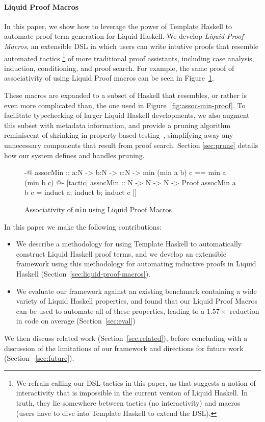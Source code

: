 \paragraph*{Liquid Proof Macros}

In this paper, we show how to leverage the power of Template Haskell
to automate proof term generation for Liquid Haskell.  We develop {\em
  Liquid Proof Macros}, an extensible DSL in which users can write
intutive proofs that resemble automated tactics%
\footnote{We refrain calling our DSL tactics in this paper, as that suggests a
  notion of interactivity that is impossible in the current version of Liquid
  Haskell. In truth, they lie somewhere between tactics (no interactivity)
  and macros (users have to dive into Template Haskell to extend the DSL).
}%
%
 of more traditional proof assistants, including case analysis,
 induction, conditioning, and proof search. For example, the same
 proof of associativity of  using Liquid Proof macros can be
 seen in Figure~\ref{fig:assoc-min-macro}. 

These macros are expanded to a subset of Haskell that resembles, or
rather is even more complicated than, the one used in
Figure~\ref{fig:assoc-min-proof}. To facilitate typechecking of larger
Liquid Haskell developments, we also augment this subset with metadata
information, and provide a pruning algorithm reminiscent of shrinking
in property-based testing~\cite{ClaessenH00}, simplifying away any
unnecessary components that result from proof search. Section
\ref{sec:prune} details how our system defines and handles pruning.


\begin{figure}[t]
\begin{code}
  {-@ assocMin :: a:N -> b:N -> c:N ->
        {min (min a b) c == min a (min b c)} @-}
  [tactic|
    assocMin :: N -> N -> N -> Proof
    assocMin a b c = induct a; induct b; induct c
  |]
\end{code}
\caption{Associativity of \texttt{min} using Liquid Proof Macros}
\label{fig:assoc-min-macro}
\end{figure}

In this paper we make the following contributions:
\begin{itemize}
\item We describe a methodology for using Template Haskell to
  automatically construct Liquid Haskell proof terms, and we develop
  an extensible framework using this methodology for automating
  inductive proofs in Liquid Haskell
  (Section~\ref{sec:liquid-proof-macros}).
\item We evaluate our framework against an existing benchmark
  containing a wide variety of Liquid Haskell properties, and found
  that our Liquid Proof Macros can be used to automate all of these
  properties, leading to a $1.57\times$ reduction in code on average
  (Section~\ref{sec:eval})
\end{itemize}
We then discuss related work (Section~\ref{sec:related}), before
concluding with a discussion of the limitations of our framework and
directions for future work (Section ~\ref{sec:future}).
